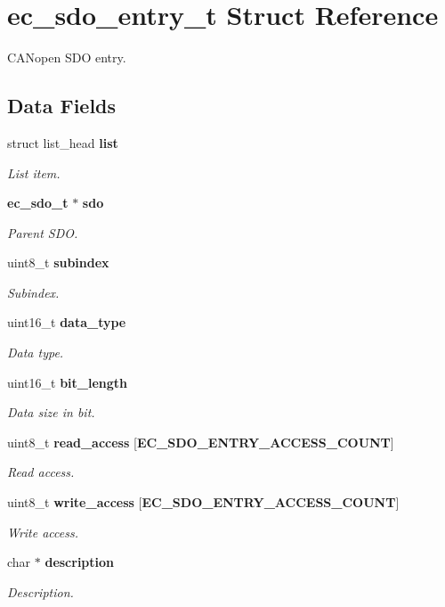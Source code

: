 \section{ec\-\_\-sdo\-\_\-entry\-\_\-t \-Struct \-Reference}
\label{structec__sdo__entry__t}


\-C\-A\-Nopen \-S\-D\-O entry.  


\subsection*{\-Data \-Fields}
\begin{DoxyCompactItemize}
\item 
struct list\-\_\-head {\bf list}
\begin{DoxyCompactList}\small\item\em \-List item. \end{DoxyCompactList}\item 
{\bf ec\-\_\-sdo\-\_\-t} $\ast$ {\bf sdo}
\begin{DoxyCompactList}\small\item\em \-Parent \-S\-D\-O. \end{DoxyCompactList}\item 
uint8\-\_\-t {\bf subindex}
\begin{DoxyCompactList}\small\item\em \-Subindex. \end{DoxyCompactList}\item 
uint16\-\_\-t {\bf data\-\_\-type}
\begin{DoxyCompactList}\small\item\em \-Data type. \end{DoxyCompactList}\item 
uint16\-\_\-t {\bf bit\-\_\-length}
\begin{DoxyCompactList}\small\item\em \-Data size in bit. \end{DoxyCompactList}\item 
uint8\-\_\-t {\bf read\-\_\-access} [{\bf \-E\-C\-\_\-\-S\-D\-O\-\_\-\-E\-N\-T\-R\-Y\-\_\-\-A\-C\-C\-E\-S\-S\-\_\-\-C\-O\-U\-N\-T}]
\begin{DoxyCompactList}\small\item\em \-Read access. \end{DoxyCompactList}\item 
uint8\-\_\-t {\bf write\-\_\-access} [{\bf \-E\-C\-\_\-\-S\-D\-O\-\_\-\-E\-N\-T\-R\-Y\-\_\-\-A\-C\-C\-E\-S\-S\-\_\-\-C\-O\-U\-N\-T}]
\begin{DoxyCompactList}\small\item\em \-Write access. \end{DoxyCompactList}\item 
char $\ast$ {\bf description}
\begin{DoxyCompactList}\small\item\em \-Description. \end{DoxyCompactList}\end{DoxyCompactItemize}



